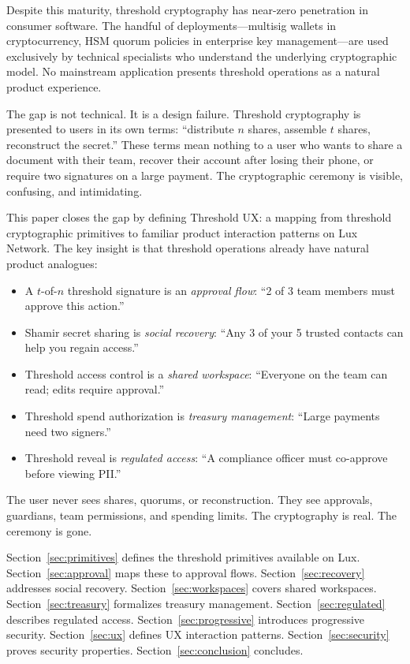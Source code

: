 \documentclass[11pt,a4paper]{article}
\begin{document}
Despite this maturity, threshold cryptography has near-zero penetration in
consumer software. The handful of deployments---multisig wallets in
cryptocurrency, HSM quorum policies in enterprise key management---are
used exclusively by technical specialists who understand the underlying
cryptographic model. No mainstream application presents threshold
operations as a natural product experience.

The gap is not technical. It is a design failure. Threshold cryptography
is presented to users in its own terms: ``distribute $n$ shares, assemble
$t$ shares, reconstruct the secret.'' These terms mean nothing to a user
who wants to share a document with their team, recover their account after
losing their phone, or require two signatures on a large payment. The
cryptographic ceremony is visible, confusing, and intimidating.

This paper closes the gap by defining Threshold UX: a mapping from
threshold cryptographic primitives to familiar product interaction patterns
on Lux Network. The key insight is that threshold operations already have
natural product analogues:

\begin{itemize}
    \item A $t$-of-$n$ threshold signature is an \emph{approval flow}: ``2 of 3 team members must approve this action.''
    \item Shamir secret sharing is \emph{social recovery}: ``Any 3 of your 5 trusted contacts can help you regain access.''
    \item Threshold access control is a \emph{shared workspace}: ``Everyone on the team can read; edits require approval.''
    \item Threshold spend authorization is \emph{treasury management}: ``Large payments need two signers.''
    \item Threshold reveal is \emph{regulated access}: ``A compliance officer must co-approve before viewing PII.''
\end{itemize}

The user never sees shares, quorums, or reconstruction. They see approvals,
guardians, team permissions, and spending limits. The cryptography is real.
The ceremony is gone.

Section~\ref{sec:primitives} defines the threshold primitives available on
Lux. Section~\ref{sec:approval} maps these to approval flows.
Section~\ref{sec:recovery} addresses social recovery.
Section~\ref{sec:workspaces} covers shared workspaces.
Section~\ref{sec:treasury} formalizes treasury management.
Section~\ref{sec:regulated} describes regulated access.
Section~\ref{sec:progressive} introduces progressive security.
Section~\ref{sec:ux} defines UX interaction patterns.
Section~\ref{sec:security} proves security properties.
Section~\ref{sec:conclusion} concludes.
\end{document}
